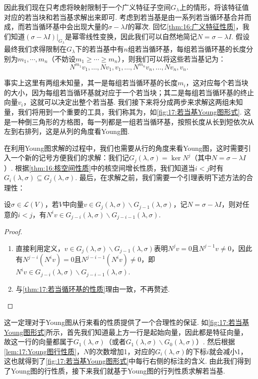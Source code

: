 因此我们现在只考虑将映射限制于一个广义特征子空间$G_\lambda$上的情形，将该特征值对应的若当块和若当基求解出来即可. 考虑到若当基是由一系列若当循环基合并而成，而若当循环基中会出现大量的$\sigma-\lambda I$的幂次. 回忆\autoref{thm:16:广义特征性质}，我们知道$(\sigma-\lambda I)\vert_{G_\lambda}$是幂零线性变换，因此我们可以自然地简记$N=\sigma-\lambda I$. 假设最终我们求得限制在$G_\lambda$下的若当基中有$n$组若当循环基，每组若当循环基的长度分别为$m_1,\cdots,m_n$（不妨设$m_1\geqslant\cdots\geqslant m_n$），则我们可以将这些若当基记为：
\[N^{m_1}v_1,\ldots,Nv_1,v_1,\ldots,N^{m_n}v_n,\ldots,Nv_n,v_n.\]

事实上这里有两组未知量，其一是每组若当循环基的长度$m_i$，这对应每个若当块的大小，因为每组若当循环基就对应于一个若当块；其二是每组若当循环基的终止向量$v_i$，这就可以决定出整个若当基. 我们接下来将分成两步来求解这两组未知量，我们将用到一个重要的工具，我们称其为，如\autoref{fig:17:若当基Young图形式}. 这是一种倒三角形的方格图，每一列都是一组若当循环基，按照长度从长到短依次从左到右排列，这是从列的角度看Young图.

在利用Young图求解的过程中，我们也需要从行的角度来看Young图，这时需要引入一个新的记号方便我们的求解：我们记$G_j(\lambda,\sigma)=\ker N^j$（其中$N=\sigma-\lambda I$）. 根据\autoref{thm:16:核空间性质}中的核空间增长性质，我们知道当$i<j$时有$G_i(\lambda,\sigma)\subseteq G_j(\lambda,\sigma)$. 最后，在求解之前，我们需要一个引理表明下述方法的合理性：
\begin{lemma} \label{lem:17:Young图行性质}
    设$\sigma\in \mathcal{L}(V)$，若$V$中向量$v\in G_j(\lambda,\sigma)\backslash G_{j-1}(\lambda,\sigma)$，记$N=\sigma-\lambda I$，则对任意的$i<j$，有$N^iv\in G_{j-i}(\lambda,\sigma)\backslash G_{j-i-1}(\lambda,\sigma)$.
\end{lemma}

\begin{proof}
    \begin{enumerate}
        \item 直接利用定义，$v\in G_j(\lambda,\sigma)\backslash G_{j-1}(\lambda,\sigma)$表明$N^jv=0$且$N^{j-1}v\neq 0$，因此有$N^{j-i}(N^iv)=0$且$N^{j-i-1}(N^iv)\neq 0$，即$N^iv\in G_{j-i}(\lambda,\sigma)\backslash G_{j-i-1}(\lambda,\sigma)$.

        \item 与\autoref{thm:17:若当循环基的性质}理由一致，不再赘述.
    \end{enumerate}
\end{proof}

这一定理对于Young图从行来看的性质提供了一个合理性的保证. 如\autoref{fig:17:若当基Young图形式}所示，首先我们知道最上方一行是起始向量，因此都是特征向量，故这一行的向量都属于$G_1(\lambda,\sigma)$（或者$G_1(\lambda,\sigma)\backslash G_0(\lambda,\sigma)$）. 然后根据\autoref{lem:17:Young图行性质}，$N$的次数增加1，对应的$G_i(\lambda,\sigma)$的下标$i$就会减小1，这也就得到了\autoref{fig:17:若当基Young图形式}中每行右侧的标注的含义. 由此我们得到了Young图的行性质，接下来我们就基于Young图的行列性质求解若当基.

